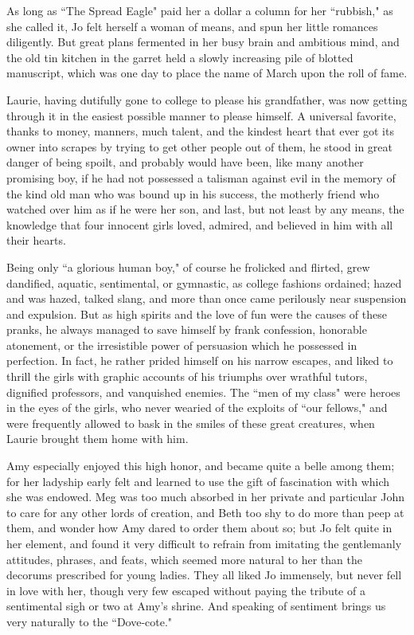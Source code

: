 As long as ``The Spread Eagle" paid her a dollar a column for her
``rubbish," as she called it, Jo felt herself a woman of means, and spun
her little romances diligently. But great plans fermented in her busy
brain and ambitious mind, and the old tin kitchen in the garret held a
slowly increasing pile of blotted manuscript, which was one day to place
the name of March upon the roll of fame.

Laurie, having dutifully gone to college to please his grandfather, was
now getting through it in the easiest possible manner to please himself.
A universal favorite, thanks to money, manners, much talent, and the
kindest heart that ever got its owner into scrapes by trying to get
other people out of them, he stood in great danger of being spoilt, and
probably would have been, like many another promising boy, if he had not
possessed a talisman against evil in the memory of the kind old man who
was bound up in his success, the motherly friend who watched over him as
if he were her son, and last, but not least by any means, the knowledge
that four innocent girls loved, admired, and believed in him with all
their hearts.

Being only ``a glorious human boy," of course he frolicked and flirted,
grew dandified, aquatic, sentimental, or gymnastic, as college fashions
ordained; hazed and was hazed, talked slang, and more than once came
perilously near suspension and expulsion. But as high spirits and the
love of fun were the causes of these pranks, he always managed to save
himself by frank confession, honorable atonement, or the irresistible
power of persuasion which he possessed in perfection. In fact, he rather
prided himself on his narrow escapes, and liked to thrill the girls with
graphic accounts of his triumphs over wrathful tutors, dignified
professors, and vanquished enemies. The ``men of my class" were heroes in
the eyes of the girls, who never wearied of the exploits of ``our
fellows," and were frequently allowed to bask in the smiles of these
great creatures, when Laurie brought them home with him.

Amy especially enjoyed this high honor, and became quite a belle among
them; for her ladyship early felt and learned to use the gift of
fascination with which she was endowed. Meg was too much absorbed in her
private and particular John to care for any other lords of creation, and
Beth too shy to do more than peep at them, and wonder how Amy dared to
order them about so; but Jo felt quite in her element, and found it very
difficult to refrain from imitating the gentlemanly attitudes, phrases,
and feats, which seemed more natural to her than the decorums prescribed
for young ladies. They all liked Jo immensely, but never fell in love
with her, though very few escaped without paying the tribute of a
sentimental sigh or two at Amy's shrine. And speaking of
sentiment brings us very naturally to the ``Dove-cote."

